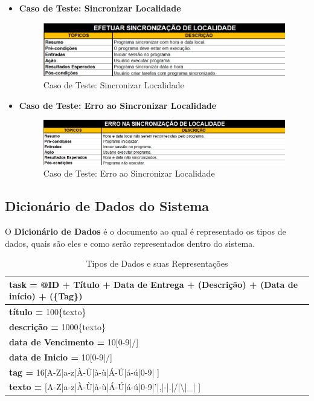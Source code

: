 \documentclass[a4paper,12pt]{article}
\begin{document}
\pagebreak
\begin{itemize}
	\item\textbf{Caso de Teste: Sincronizar Localidade}
	\begin{figure}[H]
		\centering
		\includegraphics[scale=0.65]{UnitTest/trueCase/syncLocale.png}
		\caption{Caso de Teste: Sincronizar Localidade}
	\end{figure}

	\item\textbf{Caso de Teste: Erro ao Sincronizar Localidade}
	\begin{figure}[H]
		\centering
		\includegraphics[scale=0.65]{UnitTest/falseCase/syncLocale.png}
		\caption{Caso de Teste: Erro ao Sincronizar Localidade}
	\end{figure}
\end{itemize}

\subsection{Dicionário de Dados do Sistema}
O \textbf{Dicionário de Dados} é o documento ao qual é representado os tipos de dados, quais são eles e como serão 
representados dentro do sistema.
\begin{table}[H]
	\noindent
	\begin{tabular}{|l|}
		\hline
			\textbf{task =} @ID + Título + Data de Entrega + (Descrição) + (Data de início) + (\{Tag\})\\ \hline
			\textbf{título =} 100\{texto\} \\ \hline
			\textbf{descrição =} 1000\{texto\} \\ \hline
			\textbf{data de Vencimento =} 10[0-9|/] \\ \hline
			\textbf{data de Inicio =} 10[0-9|/] \\ \hline
			\textbf{tag =} 16[A-Z|a-z|À-Ù|à-ù|Á-Ú|á-ú|0-9| ] \\ \hline
			\textbf{texto =} [A-Z|a-z|À-Ù|à-ù|Á-Ú|á-ú|0-9|'|,|-|.|/|\textbackslash|\_| ] \\ \hline
	\end{tabular}
	\caption{Tipos de Dados e suas Representações}
\end{table}
\end{document}
